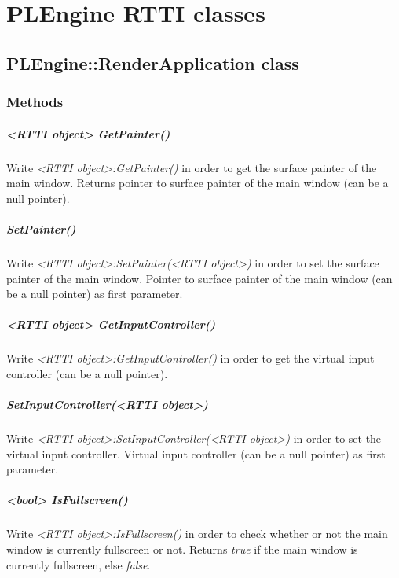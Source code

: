 \chapter{PLEngine RTTI classes}




\section{PLEngine::RenderApplication class}


\subsection{Methods}

\paragraph{<RTTI object> GetPainter()}
Write \emph{<RTTI object>:GetPainter()} in order to get the surface painter of the main window. Returns pointer to surface painter of the main window (can be a null pointer).

\paragraph{SetPainter()}
Write \emph{<RTTI object>:SetPainter(<RTTI object>)} in order to set the surface painter of the main window. Pointer to surface painter of the main window (can be a null pointer) as first parameter.

\paragraph{<RTTI object> GetInputController()}
Write \emph{<RTTI object>:GetInputController()} in order to get the virtual input controller (can be a null pointer).

\paragraph{SetInputController(<RTTI object>)}
Write \emph{<RTTI object>:SetInputController(<RTTI object>)} in order to set the virtual input controller. Virtual input controller (can be a null pointer) as first parameter.

\paragraph{<bool> IsFullscreen()}
Write \emph{<RTTI object>:IsFullscreen()} in order to check whether or not the main window is currently fullscreen or not. Returns \emph{true} if the main window is currently fullscreen, else \emph{false}.

